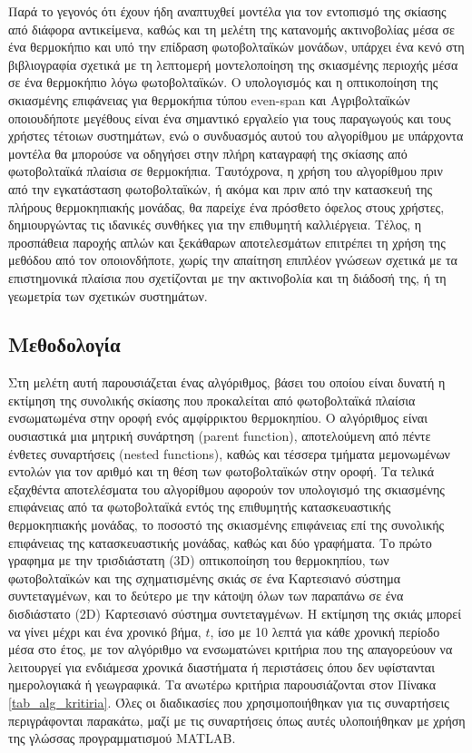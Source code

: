 \documentclass[12pt, a4paper]{report} %
\newcommand{\english}{\foreignlanguage{english}}
\begin{document}
Παρά το γεγονός ότι έχουν ήδη αναπτυχθεί μοντέλα για τον εντοπισμό της σκίασης από διάφορα αντικείμενα, καθώς και 
τη μελέτη της κατανομής ακτινοβολίας μέσα σε ένα θερμοκήπιο και υπό την επίδραση φωτοβολταϊκών μονάδων, υπάρχει ένα 
κενό στη βιβλιογραφία σχετικά με τη λεπτομερή μοντελοποίηση της σκιασμένης περιοχής μέσα σε ένα θερμοκήπιο λόγω 
φωτοβολταϊκών. Ο υπολογισμός και η οπτικοποίηση της σκιασμένης επιφάνειας για θερμοκήπια τύπου \english{even-span} και 
Αγριβολταϊκών οποιουδήποτε μεγέθους είναι ένα σημαντικό εργαλείο για τους παραγωγούς και τους χρήστες τέτοιων συστημάτων, 
ενώ ο συνδυασμός αυτού του αλγορίθμου με υπάρχοντα μοντέλα θα μπορούσε να οδηγήσει στην πλήρη καταγραφή της σκίασης από 
φωτοβολταϊκά πλαίσια σε θερμοκήπια. Ταυτόχρονα, η χρήση του αλγορίθμου πριν από την εγκατάσταση φωτοβολταϊκών, ή ακόμα 
και πριν από την κατασκευή της πλήρους θερμοκηπιακής μονάδας, θα παρείχε ένα πρόσθετο όφελος στους χρήστες, δημιουργώντας 
τις ιδανικές συνθήκες για την επιθυμητή καλλιέργεια. Τέλος, η προσπάθεια παροχής απλών και ξεκάθαρων αποτελεσμάτων 
επιτρέπει τη χρήση της μεθόδου από τον οποιονδήποτε, χωρίς την απαίτηση επιπλέον γνώσεων σχετικά με τα επιστημονικά 
πλαίσια που σχετίζονται με την ακτινοβολία και τη διάδοσή της, ή τη γεωμετρία των σχετικών συστημάτων.

\subsection{Μεθοδολογία}\label{sub_alg_methods}

Στη μελέτη αυτή παρουσιάζεται ένας αλγόριθμος, βάσει του οποίου είναι δυνατή η εκτίμηση της συνολικής σκίασης 
που προκαλείται από φωτοβολταϊκά πλαίσια ενσωματωμένα στην οροφή ενός αμφίρρικτου θερμοκηπίου. Ο αλγόριθμος είναι 
ουσιαστικά μια μητρική συνάρτηση (\english{parent function}), αποτελούμενη από πέντε ένθετες συναρτήσεις 
(\english{nested functions}), καθώς και τέσσερα τμήματα μεμονωμένων εντολών για τον αριθμό και τη θέση των 
φωτοβολταϊκών στην οροφή. Τα τελικά εξαχθέντα αποτελέσματα του αλγορίθμου αφορούν τον υπολογισμό της σκιασμένης 
επιφάνειας από τα φωτοβολταϊκά εντός της επιθυμητής κατασκευαστικής θερμοκηπιακής μονάδας, το ποσοστό της 
σκιασμένης επιφάνειας επί της συνολικής επιφάνειας της κατασκευαστικής μονάδας, καθώς και δύο γραφήματα. Το πρώτο γραφημα 
με την τρισδιάστατη (\english{3D}) οπτικοποίηση του θερμοκηπίου, των φωτοβολταϊκών και της σχηματισμένης σκιάς σε 
ένα Καρτεσιανό σύστημα συντεταγμένων, και το δεύτερο με την κάτοψη όλων των παραπάνω σε ένα δισδιάστατο 
(\english{2D}) Kαρτεσιανό σύστημα συντεταγμένων. Η εκτίμηση της σκιάς μπορεί να γίνει μέχρι και ένα χρονικό βήμα, 
\english{$t$}, ίσο με 10 λεπτά για κάθε χρονική περίοδο μέσα στο έτος, με τον αλγόριθμο να ενσωματώνει κριτήρια που 
της απαγορεύουν να λειτουργεί για ενδιάμεσα χρονικά διαστήματα ή περιστάσεις όπου δεν υφίστανται ημερολογιακά ή 
γεωγραφικά. Τα ανωτέρω κριτήρια παρουσιάζονται στον Πίνακα \ref{tab_alg_kritiria}. Όλες οι διαδικασίες που 
χρησιμοποιήθηκαν για τις συναρτήσεις περιγράφονται παρακάτω, μαζί με τις συναρτήσεις όπως αυτές υλοποιήθηκαν με 
χρήση της γλώσσας προγραμματισμού \english{MATLAB}.
\end{document}
